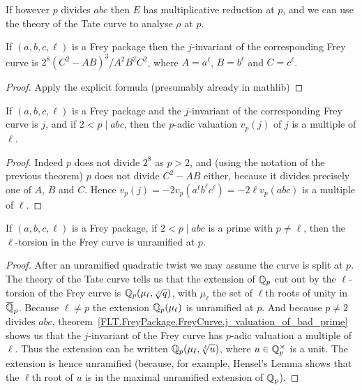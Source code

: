 If however $p$ divides $abc$ then $E$ has multiplicative 
reduction at $p$, and we can use the theory of the Tate curve to analyse $\rho$ at $p$.

\begin{theorem}\label{Frey_curve_j}\leanok{} If $(a,b,c,\ell)$ is a Frey package then the $j$-invariant of the corresponding Frey curve is $2^8(C^2-AB)^3/A^2B^2C^2$, where $A=a^\ell$, $B=b^\ell$ and $C=c^\ell$.
\end{theorem}
\begin{proof}
  \leanok
  Apply the explicit formula (presumably already in mathlib)
\end{proof}

\begin{corollary}
  \label{FLT.FreyPackage.FreyCurve.j_valuation_of_bad_prime}
  \leanok
  If $(a,b,c,\ell)$ is a Frey package and the $j$-invariant of the corresponding Frey curve is $j$, and if $2<p\mid abc$, then the $p$-adic valuation $v_p(j)$ of $j$ is a multiple of $\ell$.
\end{corollary}
\begin{proof}
  \leanok
  Indeed $p$ does not divide $2^8$ as $p>2$, and (using the notation of the previous theorem) $p$ does not divide $C^2-AB$ either, because it divides precisely one of $A$, $B$ and $C$. Hence $v_p(j)=-2v_p(a^\ell b^\ell c^\ell)=-2\ell v_p(abc)$ is a multiple of $\ell$.
\end{proof}

\begin{corollary}\label{Frey_curve_unram}\notready If $(a,b,c,\ell)$ is a Frey package, if $2<p\mid abc$
  is a prime with $p\not=\ell$, then the $\ell$-torsion in the Frey curve is unramified
  at $p$.
\end{corollary}
\begin{proof}
  After an unramified quadratic twist we may assume the curve is split at $p$.
  The theory of the Tate curve tells us that the extension of $\mathbb{Q}_p$ cut out by the $\ell$-torsion
  of the Frey curve is $\mathbb{Q}_p(\mu_\ell,\sqrt[\ell]{q})$, with $\mu_\ell$ the set of $\ell$th roots
  of unity in $\overline{\mathbb{Q}}_p$. Because $\ell\not=p$ the extension
  $\mathbb{Q}_p(\mu_\ell)$ is unramified at $p$. And because $p\not=2$ divides $abc$, 
  theorem~\ref{FLT.FreyPackage.FreyCurve.j_valuation_of_bad_prime} shows us that the $j$-invariant
  of the Frey curve has $p$-adic valuation a multiple of $\ell$.
  Thus the extension can be written $\mathbb{Q}_p(\mu_\ell,\sqrt[\ell]{u})$,
  where $u\in\mathbb{Q}_p^\times$ is a unit. The extension is hence unramified (because, for example,
  Hensel's Lemma shows that the $\ell$th root of $u$ is in the maximal unramified
  extension of $\mathbb{Q}_p$).
\end{proof}

